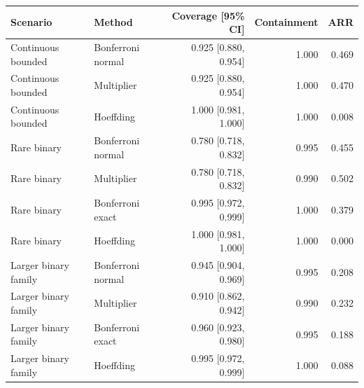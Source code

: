 \begin{tabular}{llrrr}
\toprule
Scenario & Method & Coverage [95\% CI] & Containment & ARR \\
\midrule
Continuous bounded & Bonferroni normal & 0.925 [0.880, 0.954] & 1.000 & 0.469 \\
Continuous bounded & Multiplier & 0.925 [0.880, 0.954] & 1.000 & 0.470 \\
Continuous bounded & Hoeffding & 1.000 [0.981, 1.000] & 1.000 & 0.008 \\
Rare binary & Bonferroni normal & 0.780 [0.718, 0.832] & 0.995 & 0.455 \\
Rare binary & Multiplier & 0.780 [0.718, 0.832] & 0.990 & 0.502 \\
Rare binary & Bonferroni exact & 0.995 [0.972, 0.999] & 1.000 & 0.379 \\
Rare binary & Hoeffding & 1.000 [0.981, 1.000] & 1.000 & 0.000 \\
Larger binary family & Bonferroni normal & 0.945 [0.904, 0.969] & 0.995 & 0.208 \\
Larger binary family & Multiplier & 0.910 [0.862, 0.942] & 0.990 & 0.232 \\
Larger binary family & Bonferroni exact & 0.960 [0.923, 0.980] & 0.995 & 0.188 \\
Larger binary family & Hoeffding & 0.995 [0.972, 0.999] & 1.000 & 0.088 \\
\bottomrule
\end{tabular}
